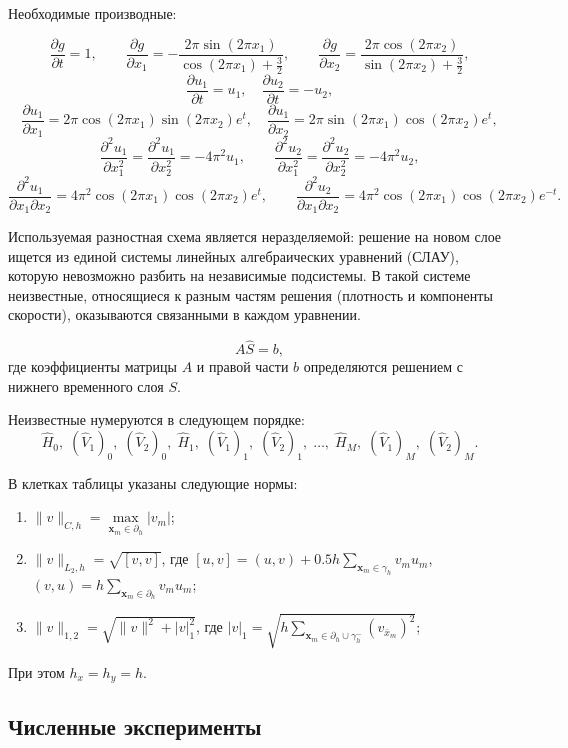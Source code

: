 \documentclass[a4paper,12pt]{extarticle}
\begin{document}
Необходимые производные:

\[
\frac{\partial g}{\partial t}=1,\qquad
\frac{\partial g}{\partial x_1}= -\frac{2\pi\sin(2\pi x_1)}{\cos(2\pi x_1)+\frac{3}{2}},\qquad
\frac{\partial g}{\partial x_2}= \frac{2\pi\cos(2\pi x_2)}{\sin(2\pi x_2)+\frac{3}{2}},
\]
\[
\frac{\partial u_1}{\partial t}=u_1,\quad
\frac{\partial u_2}{\partial t}=-u_2,
\]
\[
\frac{\partial u_1}{\partial x_1}=2\pi\cos(2\pi x_1)\sin(2\pi x_2)e^{t},\quad
\frac{\partial u_1}{\partial x_2}=2\pi\sin(2\pi x_1)\cos(2\pi x_2)e^{t},
\]
\[
\frac{\partial^2 u_1}{\partial x_1^2}= \frac{\partial^2 u_1}{\partial x_2^2}= -4\pi^2 u_1,\qquad
\frac{\partial^2 u_2}{\partial x_1^2}= \frac{\partial^2 u_2}{\partial x_2^2}= -4\pi^2 u_2,
\]
\[
\frac{\partial^2 u_1}{\partial x_1\partial x_2}=4\pi^2\cos(2\pi x_1)\cos(2\pi x_2)e^{t},\qquad
\frac{\partial^2 u_2}{\partial x_1\partial x_2}=4\pi^2\cos(2\pi x_1)\cos(2\pi x_2)e^{-t}.
\]

Используемая разностная схема является неразделяемой: решение на новом слое ищется из единой системы линейных алгебраических уравнений (СЛАУ), которую невозможно разбить на независимые подсистемы. В такой системе неизвестные, относящиеся к разным частям решения (плотность и компоненты скорости), оказываются связанными в каждом уравнении.

\[
A\hat{S} = b,
\]
где коэффициенты матрицы \(A\) и правой части \(b\) определяются решением с нижнего временного слоя \(S\).

Неизвестные нумеруются в следующем порядке:
\[
\hat{H}_0,\; (\hat{V}_1)_0,\; (\hat{V}_2)_0,\;
\hat{H}_1,\; (\hat{V}_1)_1,\; (\hat{V}_2)_1,\;
\dots,\;
\hat{H}_M,\; (\hat{V}_1)_M,\; (\hat{V}_2)_M.
\]

В клетках таблицы указаны следующие нормы:
\begin{enumerate}
	\item \(\|v\|_{C,h} = \max\limits_{\mathbf{x}_m\in\partial_h} |v_m|\);
	\item \(\|v\|_{L_2,h} = \sqrt{[v,v]}\), где \([u,v] = (u,v) + 0.5h\sum\limits_{\mathbf{x}_m\in\gamma_h} v_m u_m\), \((v,u)=h\sum\limits_{\mathbf{x}_m\in\partial_h} v_m u_m\);
	\item \(\|v\|_{1,2} = \sqrt{\|v\|^2 + |v|_1^2}\), где \(|v|_1 = \sqrt{h\sum\limits_{\mathbf{x}_m\in\partial_h\cup\gamma_h^-} (v_{\bar{x}_m})^2}\);
\end{enumerate}
При этом $h_{x} = h_{y} = h$.

\subsection{Численные эксперименты}
\end{document}

